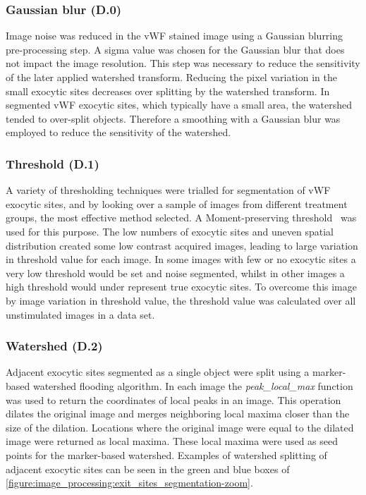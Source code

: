 \subsubsection{Gaussian blur (D.0)}
Image noise was reduced in the vWF stained image using a Gaussian blurring pre-processing step. A sigma value was chosen for the Gaussian blur that does not impact the image resolution. This step was necessary to reduce the sensitivity of the later applied watershed transform. Reducing the pixel variation in the small exocytic sites decreases over splitting by the watershed transform. In segmented vWF exocytic sites, which typically have a small area, the watershed tended to over-split objects. Therefore a smoothing with a Gaussian blur was employed to reduce the sensitivity of the watershed.

\subsubsection{Threshold (D.1)}
A variety of thresholding techniques were trialled for segmentation of vWF exocytic sites, and by looking over a sample of images from different treatment groups, the most effective method selected. A Moment-preserving threshold~\cite{Tsai1985} was used for this purpose. The low numbers of exocytic sites and uneven spatial distribution created some low contrast acquired images, leading to large variation in threshold value for each image. In some images with few or no exocytic sites a very low threshold would be set and noise segmented, whilst in other images a high threshold would under represent true exocytic sites. To overcome this image by image variation in threshold value, the threshold value was calculated over all unstimulated images in a data set.

\subsubsection{Watershed (D.2)}
Adjacent exocytic sites segmented as a single object were split using a marker-based watershed flooding algorithm. In each image the \emph{peak\_local\_max} function was used to return the coordinates of local peaks in an image. This operation dilates the original image and merges neighboring local maxima closer than the size of the dilation. Locations where the original image were equal to the dilated image were returned as local maxima. These local maxima were used as seed points for the marker-based watershed. Examples of watershed splitting of adjacent exocytic sites can be seen in the green and blue boxes of \autoref{figure:image_processing:exit_sites_segmentation-zoom}.

